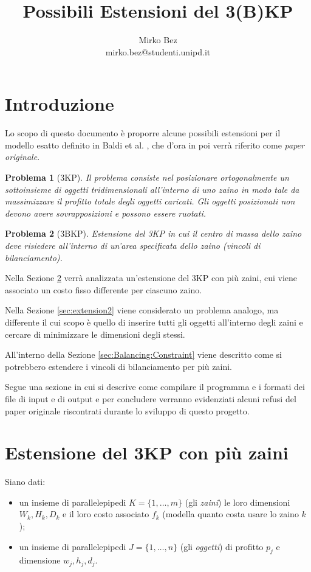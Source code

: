\documentclass{scrartcl}
\title{Possibili Estensioni del 3(B)KP}
\author{Mirko Bez \\
	mirko.bez@studenti.unipd.it
	}
\newtheorem{problem}{Problema}
\begin{document}
\maketitle
\tableofcontents
\newpage
\section{Introduzione}
Lo scopo di questo documento è proporre alcune possibili estensioni per il modello esatto definito in Baldi et al. \cite{Baldi20129802}, che d'ora in poi verrà riferito come \emph{paper originale}.

\begin{problem}[3KP]
Il problema consiste nel posizionare ortogonalmente un sottoinsieme di oggetti tridimensionali all'interno di uno zaino in modo tale da massimizzare il profitto totale degli oggetti caricati. 
Gli oggetti posizionati non devono avere sovrapposizioni e possono essere ruotati.
\end{problem}

\begin{problem}[3BKP]
	Estensione del 3KP in cui il centro di massa dello zaino deve risiedere all'interno di un'area specificata dello zaino (vincoli di bilanciamento).
\end{problem}



Nella Sezione \ref{sec:extension1} verrà analizzata un'estensione del 3KP con più zaini, cui viene associato un costo fisso differente per ciascuno zaino.

Nella Sezione \ref{sec:extension2} viene considerato un problema analogo, ma differente il cui scopo è quello di inserire tutti gli oggetti all'interno degli zaini e cercare di minimizzare le dimensioni degli stessi. 

 All'interno della Sezione \ref{sec:Balancing:Constraint} viene descritto come si potrebbero estendere i vincoli di bilanciamento per più zaini. 


Segue una sezione in cui si descrive come compilare il programma e i formati dei file di input e di output e per concludere verranno evidenziati alcuni refusi del paper originale riscontrati durante lo sviluppo di questo progetto.


\section{Estensione del 3KP con più zaini}
\label{sec:extension1}

Siano dati:
\begin{itemize} 
	
	\item un insieme di parallelepipedi $K = \{1, \dots, m \}$ (gli \emph{zaini}) le loro dimensioni $W_k, H_k, D_k$ e il loro costo associato $f_k$ (modella quanto costa usare lo zaino $k$);
	\item un insieme di parallelepipedi $J = \{1, \dots, n\}$ (gli \emph{oggetti}) di profitto $p_j$ e dimensione $w_j, h_j, d_j$.
\end{itemize}
\end{document}
